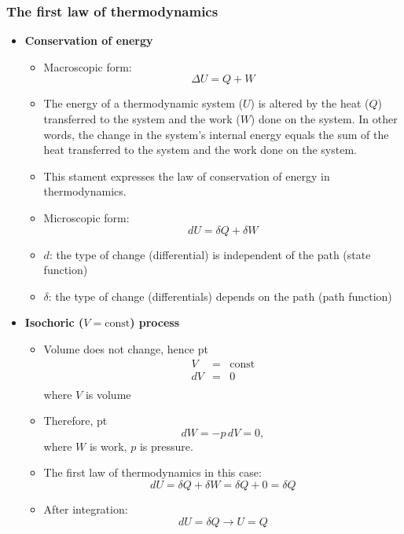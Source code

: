 \documentclass[t,aspectratio=169]{beamer}
\begin{document}
\begin{frame}
\frametitle{The first law of thermodynamics}

\begin{itemize}
\item \textbf{Conservation of energy}
\begin{itemize}
\item Macroscopic form:
$$ \Delta U = Q + W$$


\item The energy of a thermodynamic system ($U$) is altered by the heat ($Q$) transferred to the system and the work ($W$) done on the system. In other words, the change in the system’s internal energy equals the sum of the heat transferred to the system and the work done on the system.
\item This stament expresses the law of conservation of energy in thermodynamics.
  
\smallskip

\item Microscopic form:
$$ dU = \delta Q + \delta W $$
\item $d$: the type of change (differential) is independent of the path (state function)
\item $\delta$: the type of change (differentials) depends on the path (path function)
\end{itemize}

\pagebreak
\item \textbf{Isochoric ($V = \text{const}$) process}
\begin{itemize}  
\item Volume does not change, hence
 pt
\begin{eqnarray*}
V &=& \text{const}\\
dV &=& 0 \\
\end{eqnarray*}
where $V$ is volume 
\item Therefore,
 pt
$$ dW = -p\, dV = 0,$$
where $W$ is work, $p$ is pressure.
\item The first law of thermodynamics in this case:
$$ dU = \delta Q + \delta W = \delta Q + 0 = \delta Q $$

\pagebreak
\item After integration:
$$dU=\delta Q \rightarrow U=Q $$


\end{itemize}
\end{itemize}
\end{frame}
\end{document}
